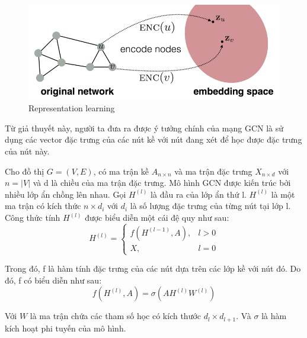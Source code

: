 \begin{figure}[H]
    \begin{center}
        \includegraphics[scale=0.5]{images/representation-learning}
        \caption{Representation learning}
        \label{fig:representation-learning}
    \end{center}
\end{figure}


Từ giả thuyết này, người ta đưa ra được ý tưởng chính của mạng GCN là sử dụng các vector đặc trưng của các nút kề với nút đang xét để học được đặc trưng của nút này.

Cho đồ thị $G = (V,E)$, có ma trận kề $A_{n \times n}$ và ma trận đặc trưng $X_{n \times d}$ với $n = |V|$ và d là chiều của ma trận đặc trưng. Mô hình GCN được kiến trúc bởi nhiều lớp ẩn chồng lên nhau. Gọi $H^{(l)}$ là đầu ra của lớp ẩn thứ l. $H^{(l)}$ là một ma trận có kích thức $n \times d_i$ với $d_i$ là số lượng đặc trưng của từng nút tại lớp l. Công thức tính $H^{(l)}$ được biểu diễn một cái đệ quy như sau:
\begin{equation*}
	H^{(l)} = 
	\begin{cases}
		f(H^{(l-1)}, A), & l > 0 \\
		X, & l = 0		
	\end{cases}
\end{equation*}

Trong đó, f là hàm tính đặc trưng của các nút dựa trên các lớp kề với nút đó. Do đó, f có biểu diễn như sau:
\begin{equation*}
	f(H^{(l)}, A) = \sigma(AH^{(l)}W^{(l)})
\end{equation*}

Với $W$ là ma trận chứa các tham số học có kích thước $d_l \times d_{l+1}$. Và $\sigma$ là hàm kích hoạt phi tuyến của mô hình. 

